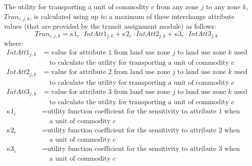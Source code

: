 The utility for transporting a unit of commodity $c$ from any zone $j$ to any zone $k$, $Tran_{c,j,k}$, is calculated using up to a maximum of three interchange attribute values (that are provided by the transit assignment module) as follows:
\begin{equation}\label{eq:6.20}
Tran_{c,j,k} = \kappa 1_c \cdot IntAtt1_{j,k} + \kappa 2_c \cdot IntAtt2_{j,k} + \kappa 3_c \cdot IntAtt3_{j,k}
\end{equation}
\noindent where:
\begin{align*}
IntAtt1_{j,k} &= \text{value for attribute 1 from land use zone $j$ to land use zone $k$ used} \\
 &~~~~~\text{to calculate the utility for transporting a unit of commodity $c$} \\
IntAtt2_{j,k} &= \text{value for attribute 2 from land use zone $j$ to land use zone $k$ used} \\
 &~~~~~\text{to calculate the utility for transporting a unit of commodity $c$} \\
IntAtt3_{j,k} &= \text{value for attribute 3 from land use zone $j$ to land use zone $k$ used} \\
 &~~~~~\text{to calculate the utility for transporting a unit of commodity $c$} \\
\kappa 1_c &= \text{utility function coefficient for the sensitivity to attribute 1 when transporting} \\
 &~~~~~\text{a unit of commodity $c$} \\
\kappa 2_c &= \text{utility function coefficient for the sensitivity to attribute 2 when transporting} \\
 &~~~~~\text{a unit of commodity $c$} \\
\kappa 3_c &= \text{utility function coefficient for the sensitivity to attribute 3 when transporting} \\
 &~~~~~\text{a unit of commodity $c$}
\end{align*}

